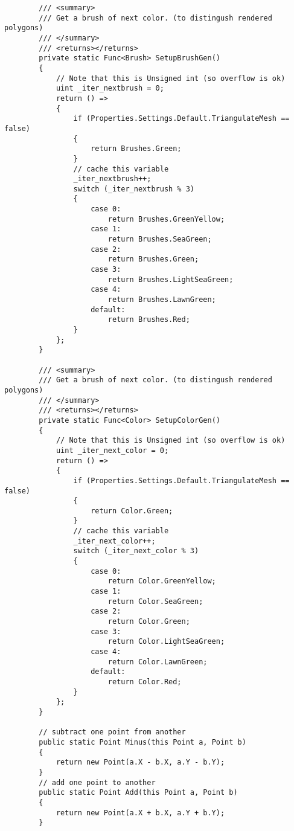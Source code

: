 \begin{scriptsize}
\begin{verbatim}
        /// <summary>
        /// Get a brush of next color. (to distingush rendered polygons)
        /// </summary>
        /// <returns></returns>
        private static Func<Brush> SetupBrushGen()
        {
            // Note that this is Unsigned int (so overflow is ok)
            uint _iter_nextbrush = 0;
            return () =>
            {
                if (Properties.Settings.Default.TriangulateMesh == false)
                {
                    return Brushes.Green;
                }
                // cache this variable
                _iter_nextbrush++;
                switch (_iter_nextbrush % 3)
                {
                    case 0:
                        return Brushes.GreenYellow;
                    case 1:
                        return Brushes.SeaGreen;
                    case 2:
                        return Brushes.Green;
                    case 3:
                        return Brushes.LightSeaGreen;
                    case 4:
                        return Brushes.LawnGreen;
                    default:
                        return Brushes.Red;
                }
            };
        }

        /// <summary>
        /// Get a brush of next color. (to distingush rendered polygons)
        /// </summary>
        /// <returns></returns>
        private static Func<Color> SetupColorGen()
        {
            // Note that this is Unsigned int (so overflow is ok)
            uint _iter_next_color = 0;
            return () =>
            {
                if (Properties.Settings.Default.TriangulateMesh == false)
                {
                    return Color.Green;
                }
                // cache this variable
                _iter_next_color++;
                switch (_iter_next_color % 3)
                {
                    case 0:
                        return Color.GreenYellow;
                    case 1:
                        return Color.SeaGreen;
                    case 2:
                        return Color.Green;
                    case 3:
                        return Color.LightSeaGreen;
                    case 4:
                        return Color.LawnGreen;
                    default:
                        return Color.Red;
                }
            };
        }

        // subtract one point from another
        public static Point Minus(this Point a, Point b)
        {
            return new Point(a.X - b.X, a.Y - b.Y);
        }
        // add one point to another
        public static Point Add(this Point a, Point b)
        {
            return new Point(a.X + b.X, a.Y + b.Y);
        }


\end{verbatim}
\end{scriptsize}

